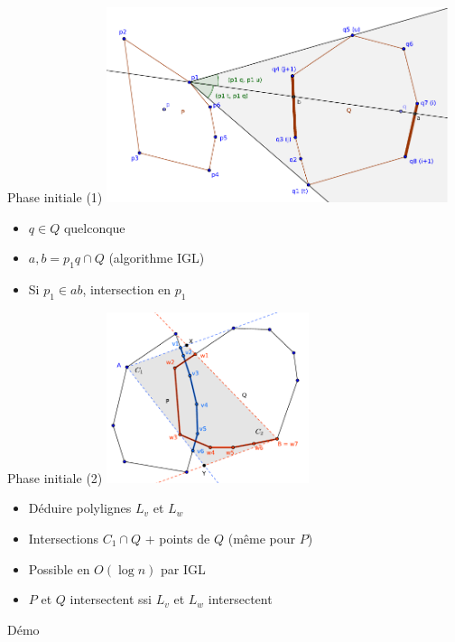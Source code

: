 \documentclass{beamer}
\begin{document}
\begin{frame}{Phase initiale (1)}
	\includegraphics[width=10cm]{igg2.pdf}
	\begin{itemize}
	\item $q \in Q$ quelconque
	\item $a, b = p_{1}q \cap Q$ (algorithme IGL)
	\item Si $p_{1} \in ab$, intersection en $p_{1}$
	\end{itemize}
\end{frame}

\begin{frame}{Phase initiale (2)}
	\includegraphics[height=5cm]{igg3.pdf}
	\begin{itemize}
	\item Déduire polylignes $L_{v}$ et $L_{w}$
	\item Intersections $C_{1} \cap Q$ + points de $Q$ (même pour $P$)
	\item Possible en $O(\log n)$ par IGL
	\item $P$ et $Q$ intersectent ssi $L_{v}$ et $L_{w}$ intersectent 
	\end{itemize}
\end{frame}

\begin{frame}
	\Large{Démo}
\end{frame}
\end{document}
